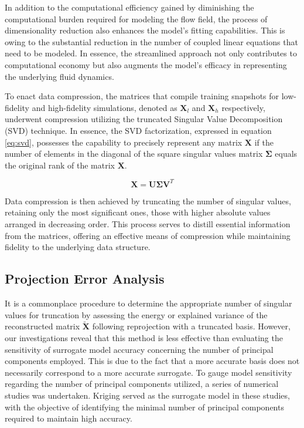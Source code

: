 In addition to the computational efficiency gained by diminishing the computational burden required for modeling the flow field, the process of dimensionality reduction also enhances the model's fitting capabilities. This is owing to the substantial reduction in the number of coupled linear equations that need to be modeled. In essence, the streamlined approach not only contributes to computational economy but also augments the model's efficacy in representing the underlying fluid dynamics.

To enact data compression, the matrices that compile training snapshots for low-fidelity and high-fidelity simulations, denoted as $\mathbf{X}_{l}$ and $\mathbf{X}_h$ respectively, underwent compression utilizing the truncated Singular Value Decomposition (SVD) technique. In essence, the SVD factorization, expressed in equation \ref{eq:svd}, possesses the capability to precisely represent any matrix $\mathbf{X}$ if the number of elements in the diagonal of the square singular values matrix $\mathbf{\Sigma}$ equals the original rank of the matrix $\mathbf{X}$. 

\begin{equation}
    \mathbf{X} = \mathbf{U}\mathbf{\Sigma}\mathbf{V}^T  
    \label{eq:svd}
\end{equation}

Data compression is then achieved by truncating the number of singular values, retaining only the most significant ones, those with higher absolute values arranged in decreasing order. This process serves to distill essential information from the matrices, offering an effective means of compression while maintaining fidelity to the underlying data structure.

\subsection{Projection Error Analysis}

It is a commonplace procedure to determine the appropriate number of singular values for truncation by assessing the energy or explained variance of the reconstructed matrix $\mathbf{\tilde{X}}$ following reprojection with a truncated basis. However, our investigations reveal that this method is less effective than evaluating the sensitivity of surrogate model accuracy concerning the number of principal components employed. This is due to the fact that a more accurate basis does not necessarily correspond to a more accurate surrogate. To gauge model sensitivity regarding the number of principal components utilized, a series of numerical studies was undertaken. Kriging served as the surrogate model in these studies, with the objective of identifying the minimal number of principal components required to maintain high accuracy.

